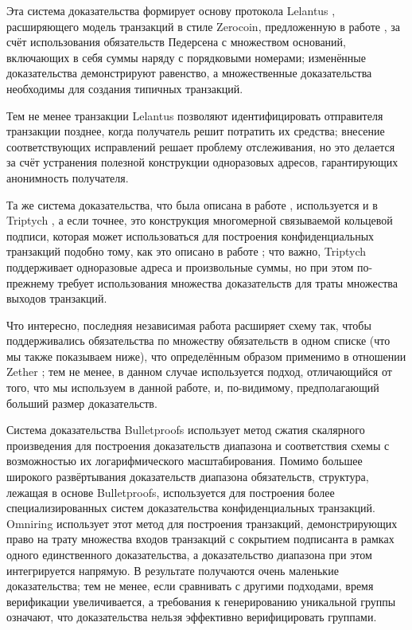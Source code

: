 \documentclass{article}
\theoremstyle{definition}
\begin{document}
Эта система доказательства формирует основу протокола Lelantus \cite{lelantus}, расширяющего модель транзакций в стиле Zerocoin, предложенную в работе \cite{groth}, за счёт использования обязательств Педерсена с множеством оснований, включающих в себя суммы наряду с порядковыми номерами; изменённые доказательства демонстрируют равенство, а множественные доказательства необходимы для создания типичных транзакций.

Тем не менее транзакции Lelantus позволяют идентифицировать отправителя транзакции позднее, когда получатель решит потратить их средства; внесение соответствующих исправлений решает проблему отслеживания, но это делается за счёт устранения полезной конструкции одноразовых адресов, гарантирующих анонимность получателя.

Та же система доказательства, что была описана в работе \cite{groth}, используется и в Triptych \cite{triptych}, а если точнее, это конструкция многомерной связываемой кольцевой подписи, которая может использоваться для построения конфиденциальных транзакций подобно тому, как это описано в работе \cite{ringct}; что важно, Triptych поддерживает одноразовые адреса и произвольные суммы, но при этом по-прежнему требует использования множества доказательств для траты множества выходов транзакций.

Что интересно, последняя независимая работа расширяет схему \cite{groth} так, чтобы поддерживались обязательства по множеству обязательств в одном списке (что мы также показываем ниже), что определённым образом применимо в отношении Zether \cite{zether}; тем не менее, в данном случае используется подход, отличающийся от того, что мы используем в данной работе, и, по-видимому, предполагающий больший размер доказательств.

Система доказательства Bulletproofs \cite{bulletproofs} использует метод сжатия скалярного произведения для построения доказательств диапазона и соответствия схемы с возможностью их логарифмического масштабирования.
Помимо большее широкого развёртывания доказательств диапазона обязательств, структура, лежащая в основе Bulletproofs, используется для построения более специализированных систем доказательства конфиденциальных транзакций.
Omniring \cite{omniring} использует этот метод для построения транзакций, демонстрирующих право на трату множества входов транзакций с сокрытием подписанта в рамках одного единственного доказательства, а доказательство диапазона при этом интегрируется напрямую. В результате получаются очень маленькие доказательства; тем не менее, если сравнивать с другими подходами, время верификации увеличивается, а требования к генерированию уникальной группы означают, что доказательства нельзя эффективно верифицировать группами.
\end{document}
